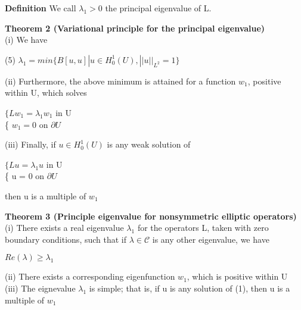 \documentclass{article}
\newcommand\tab[1][1cm]{\hspace*{#1}}
\begin{document}
\textbf {Definition} We call $\lambda_1 > 0$ the principal eigenvalue of L.

\textbf {Theorem 2 (Variational principle for the principal eigenvalue)} \\ \tab (i) We have
\begin{center}
(5) \tab $\lambda_1 = min\{B[u,u] | u \in H_0^1 (U), ||u||_{L^{2}} = 1\}$
\end{center}
\tab (ii) Furthermore, the above minimum is attained for a function $w_1$, positive within U, which solves
\begin{center}
$\{ Lw_1 = \lambda_1 w_1$ \tab in U \\
\{ $w_1 = 0$ \tab on $\partial U$
\end{center}
\tab (iii) Finally, if $u \in H_0^1(U)$ is any weak solution of 
\begin{center}
$\{ Lu = \lambda_1 u$ \tab in U \\
\{ u = 0 \tab on $\partial U$
\end{center}
then u is a multiple of $w_1$

\textbf {Theorem 3 (Principle eigenvalue for nonsymmetric elliptic operators)} \\ \tab
(i) There exists a real eigenvalue $\lambda_1$ for the operators L, taken with zero boundary conditions, such that if $\lambda \in \mathcal{C}$ is any other eigenvalue, we have
\begin{center}
$Re(\lambda) \geq \lambda_1$
\end{center}
\tab (ii) There exists a corresponding eigenfunction $w_1$, which is positive within U \\
\tab (iii) The eignevalue $\lambda_1$ is simple; that is, if u is any solution of (1), then u is a multiple of $w_1$
\end{document}
